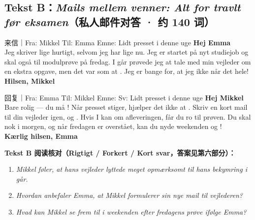\subsection*{Tekst B：\textit{Mails mellem venner: Alt for travlt før eksamen}（私人邮件对答 · 约 140 词）}

\begin{emailbox}{来信｜Fra: Mikkel \quad Til: Emma \quad Emne: Lidt presset i denne uge}
\textbf{Hej Emma}\\
Jeg skriver lige hurtigt, selvom jeg har  lige nu. Jeg er startet på nyt studiejob og skal også til modulprøve på fredag. I går prøvede jeg at tale med min vejleder om en ekstra opgave, men det var som at . Jeg er bange for, at jeg ikke når det hele!\\
\textbf{Hilsen, Mikkel}
\end{emailbox}

\begin{emailbox}{回复｜Fra: Emma \quad Til: Mikkel \quad Emne: Sv: Lidt presset i denne uge}
\textbf{Hej Mikkel}\\
Bare rolig --- du må ! Når presset stiger, hjælper det ikke at . Skriv en kort mail til din vejleder igen, og . Hvis I kan  om afleveringen, får du ro til prøven. Du skal nok  i morgen, og når fredagen er overstået, kan du nyde weekenden og !\\
\textbf{Kærlig hilsen, Emma}
\end{emailbox}

\textbf{Tekst B 阅读核对（Rigtigt / Forkert / Kort svar，答案见第六部分）：}
\begin{enumerate}
  \item \textit{Mikkel føler, at hans vejleder lyttede meget opmærksomt til hans bekymring i går.} \underline{\hspace{2.2cm}}
  \item \textit{Hvordan anbefaler Emma, at Mikkel formulerer sin nye mail til vejlederen?} \underline{\hspace{2.2cm}}
  \item \textit{Hvad kan Mikkel se frem til i weekenden efter fredagens prøve ifølge Emma?} \underline{\hspace{2.2cm}}
\end{enumerate}

